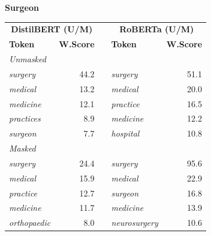 \documentclass[11pt]{article}
\begin{document}
\vspace{4pt}\noindent\textbf{Surgeon}
\begin{center}\scriptsize
\begin{tabular}{lrllr}
\toprule
\multicolumn{2}{c}{\textbf{DistilBERT (U/M)}} & & \multicolumn{2}{c}{\textbf{RoBERTa (U/M)}} \\
\textbf{Token} & \textbf{W.Score} & & \textbf{Token} & \textbf{W.Score} \\
\midrule
\multicolumn{5}{l}{\textit{Unmasked}} \\
\emph{surgery} & 44.2 & & \emph{surgery} & 51.1 \\
\emph{medical} & 13.2 & & \emph{medical} & 20.0 \\
\emph{medicine} & 12.1 & & \emph{practice} & 16.5 \\
\emph{practices} & 8.9 & & \emph{medicine} & 12.2 \\
\emph{surgeon} & 7.7 & & \emph{hospital} & 10.8 \\
\multicolumn{5}{l}{\textit{Masked}} \\
\emph{surgery} & 24.4 & & \emph{surgery} & 95.6 \\
\emph{medical} & 15.9 & & \emph{medical} & 22.9 \\
\emph{practice} & 12.7 & & \emph{surgeon} & 16.8 \\
\emph{medicine} & 11.7 & & \emph{medicine} & 13.9 \\
\emph{orthopaedic} & 8.0 & & \emph{neurosurgery} & 10.6 \\
\bottomrule
\end{tabular}
\end{center}
\end{document}
